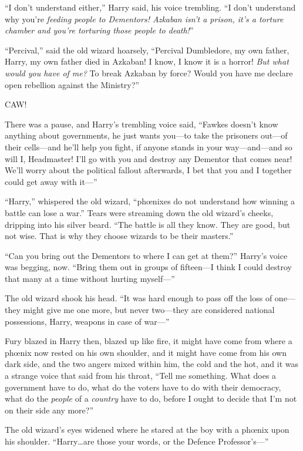 “I don’t understand either,” Harry said, his voice trembling. “I don’t understand why you’re \emph{feeding people to Dementors! Azkaban isn’t a prison, it’s a torture chamber and you’re torturing those people to \emph{death!}}”

“Percival,” said the old wizard hoarsely, “Percival Dumbledore, my own father, Harry, my own father died in Azkaban! I know, I know it is a horror! \emph{But what would you have of me?} To break Azkaban by force? Would you have me declare open rebellion against the Ministry?”

CAW!

There was a pause, and Harry’s trembling voice said, “Fawkes doesn’t know anything about governments, he just wants you—to take the prisoners out—of their cells—and he’ll help you fight, if anyone stands in your way—and—and so will I, Headmaster! I’ll go with you and destroy any Dementor that comes near! We’ll worry about the political fallout afterwards, I bet that you and I together could get away with it—”

“Harry,” whispered the old wizard, “phœnixes do not understand how winning a battle can lose a war.” Tears were streaming down the old wizard’s cheeks, dripping into his silver beard. “The battle is all they know. They are good, but not wise. That is why they choose wizards to be their masters.”

“Can you bring out the Dementors to where I can get at them?” Harry’s voice was begging, now. “Bring them out in groups of fifteen—I think I could destroy that many at a time without hurting myself—”

The old wizard shook his head. “It was hard enough to pass off the loss of one—they might give me one more, but never two—they are considered national possessions, Harry, weapons in case of war—”

Fury blazed in Harry then, blazed up like fire, it might have come from where a phœnix now rested on his own shoulder, and it might have come from his own dark side, and the two angers mixed within him, the cold and the hot, and it was a strange voice that said from his throat, “Tell me something. What does a government have to do, what do the voters have to do with their democracy, what do the \emph{people} of a \emph{country} have to do, before I ought to decide that I’m not on their side any more?”

The old wizard’s eyes widened where he stared at the boy with a phœnix upon his shoulder. “Harry…are those your words, or the Defence Professor’s—”

